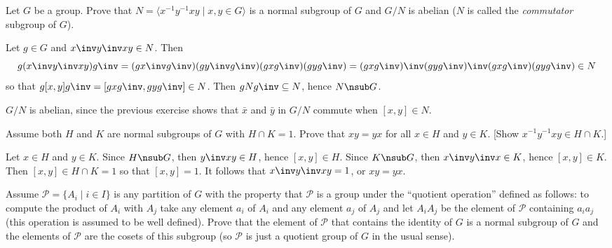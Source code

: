 \begin{specialexercise}\label{ex3.1.41}
    Let $G$ be a group. Prove that $N = \langle x^{-1}y^{-1}xy \mid x,y \in G \rangle$ is a normal subgroup of $G$ and $G/N$ is abelian ($N$ is called the \emph{commutator} subgroup of $G$).
\end{specialexercise}

\begin{sol}
    Let $g \in G$ and $x\inv y\inv xy \in N$. Then 
    \[g(x\inv y\inv xy)g\inv = (gx\inv g\inv)(g y\inv g\inv)(gxg\inv)(gyg\inv) = (gxg\inv)\inv(gyg\inv)\inv(gxg\inv)(gyg\inv) \in N\]
    so that $g[x, y]g\inv = [gxg\inv, gyg\inv] \in N$. Then $gNg\inv \subseteq N$, hence $N \nsub G$.
    
    $G/N$ is abelian, since the previous exercise shows that $\bar x$ and $\bar y$ in $G/N$ commute when $[x, y] \in N$.
\end{sol}

\begin{exercise}\label{ex3.1.42}
    Assume both $H$ and $K$ are normal subgroups of $G$ with $H \cap K = 1$. Prove that $xy = yx$ for all $x \in H$ and $y \in K$. [Show $x^{-1}y^{-1}xy \in H \cap K$.]
\end{exercise}

\begin{sol}
    Let $x \in H$ and $y \in K$. Since $H \nsub G$, then $y\inv xy \in H$, hence $[x, y] \in H$. Since $K \nsub G$, then $x\inv y\inv x\in K$, hence $[x, y] \in K$. Then $[x, y] \in H \cap K = 1$ so that $[x, y] = 1$. It follows that $x\inv y\inv xy = 1$, or $xy = yx$.
\end{sol}

\newpage

\begin{specialexercise}\label{ex3.1.43}
    Assume $\mathcal{P} = \{A_i \mid i \in I\}$ is any partition of $G$ with the property that $\mathcal{P}$ is a group under the ``quotient operation'' defined as follows: to compute the product of $A_i$ with $A_j$ take any element $a_i$ of $A_i$ and any element $a_j$ of $A_j$ and let $A_iA_j$ be the element of $\mathcal{P}$ containing $a_ia_j$ (this operation is assumed to be well defined). Prove that the element of $\mathcal{P}$ that contains the identity of $G$ is a normal subgroup of $G$ and the elements of $\mathcal{P}$ are the cosets of this subgroup (so $\mathcal{P}$ is just a quotient group of $G$ in the usual sense).
\end{specialexercise}

